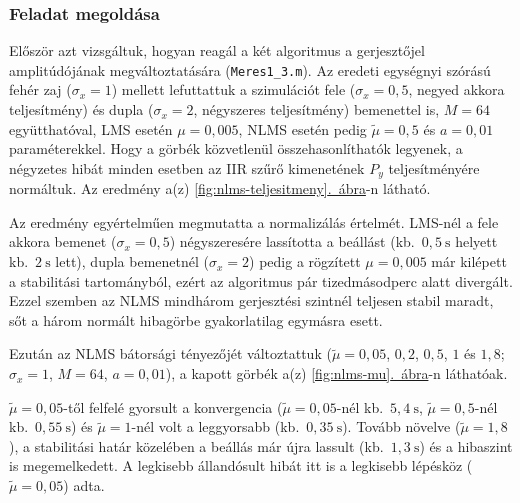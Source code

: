 \documentclass[12pt,a4paper]{article}
\newcommand{\abrara}[1]{\hyperref[#1]{\ref*{#1}.~ábra}}
\begin{document}
\subsubsection*{Feladat megoldása}

Először azt vizsgáltuk, hogyan reagál a két algoritmus a gerjesztőjel amplitúdójának megváltoztatására (\texttt{Meres1\_3.m}). Az eredeti egységnyi szórású fehér zaj ($\sigma_x = 1$) mellett lefuttattuk a szimulációt fele ($\sigma_x = 0{,}5$, negyed akkora teljesítmény) és dupla ($\sigma_x = 2$, négyszeres teljesítmény) bemenettel is, $M = 64$ együtthatóval, LMS esetén $\mu = 0{,}005$, NLMS esetén pedig $\tilde{\mu} = 0{,}5$ és $a = 0{,}01$ paraméterekkel. Hogy a görbék közvetlenül összehasonlíthatók legyenek, a négyzetes hibát minden esetben az IIR szűrő kimenetének $P_y$ teljesítményére normáltuk. Az eredmény a(z) \abrara{fig:nlms-teljesitmeny}-n látható.


Az eredmény egyértelműen megmutatta a normalizálás értelmét. LMS-nél a fele akkora bemenet ($\sigma_x = 0{,}5$) négyszeresére lassította a beállást (kb.~$0{,}5~\mathrm{s}$ helyett kb.~$2~\mathrm{s}$ lett), dupla bemenetnél ($\sigma_x = 2$) pedig a rögzített $\mu = 0{,}005$ már kilépett a stabilitási tartományból, ezért az algoritmus pár tizedmásodperc alatt divergált. Ezzel szemben az NLMS mindhárom gerjesztési szintnél teljesen stabil maradt, sőt a három normált hibagörbe gyakorlatilag egymásra esett.\par\medskip

Ezután az NLMS bátorsági tényezőjét változtattuk ($\tilde{\mu} = 0{,}05$, $0{,}2$, $0{,}5$, $1$ és $1{,}8$; $\sigma_x = 1$, $M = 64$, $a = 0{,}01$), a kapott görbék a(z) \abrara{fig:nlms-mu}-n láthatóak.


 $\tilde{\mu} = 0{,}05$-től felfelé gyorsult a konvergencia ($\tilde{\mu} = 0{,}05$-nél kb.~$5{,}4~\mathrm{s}$, $\tilde{\mu} = 0{,}5$-nél kb.~$0{,}55~\mathrm{s}$) és $\tilde{\mu} = 1$-nél volt a leggyorsabb (kb.~$0{,}35~\mathrm{s}$). Tovább növelve ($\tilde{\mu} = 1{,}8$), a stabilitási határ közelében a beállás már újra lassult (kb.~$1{,}3~\mathrm{s}$) és a hibaszint is megemelkedett. A legkisebb állandósult hibát itt is a legkisebb lépésköz ($\tilde{\mu} = 0{,}05$) adta.\par\medskip
\end{document}

